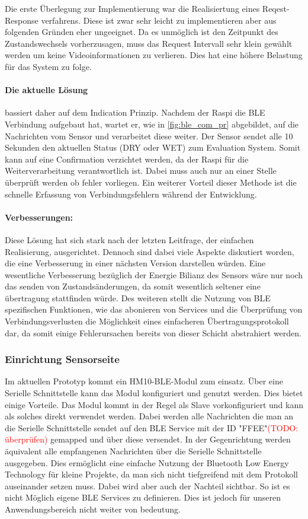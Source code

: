 Die erste Überlegung zur Implementierung war die Realisiertung eines Reqest-Response verfahrens. Diese ist zwar sehr leicht zu implementieren aber aus folgenden Gründen eher ungeeignet. 
Da es unmöglich ist den Zeitpunkt des Zustandswechsels vorherzusagen, muss das Request Intervall sehr klein gewählt werden um keine Videoinformationen zu verlieren. Dies hat eine höhere Belastung für das System zu folge. 

\paragraph{Die aktuelle Lösung} bassiert daher auf dem Indication Prinzip. Nachdem der Raspi die BLE Verbindung aufgebaut hat, wartet er, wie in \ref{fig:ble_com_pr} abgebildet, auf die Nachrichten vom Sensor und verarbeitet diese weiter. Der Sensor sendet alle 10 Sekunden den aktuellen Status (DRY oder WET) zum Evaluation System. Somit kann auf eine Confirmation verzichtet werden, da der Raspi für die Weiterverarbeitung verantwortlich ist. Dabei muss auch nur an einer Stelle überprüft werden ob fehler vorliegen. Ein weiterer Vorteil dieser Methode ist die schnelle Erfassung von Verbindungsfehlern während der Entwicklung.

\paragraph{Verbesserungen:} Diese Lösung hat sich stark nach der letzten Leitfrage, der einfachen Realisierung, ausgerichtet. Dennoch sind dabei viele Aspekte diskutiert worden, die eine Verbesserung in einer nächsten Version darstellen würden. Eine wesentliche Verbesserung bezüglich der Energie Bilianz des Sensors wäre nur noch das senden von Zustandsänderungen, da somit wesentlich seltener eine übertragung stattfinden würde. Des weiteren stellt die Nutzung von BLE spezifischen Funktionen, wie das abonieren von Services und die Überprüfung von Verbindungsverlusten die Möglichkeit eines einfacheren Übertragungsprotokoll dar, da somit einige Fehlerursachen bereits von dieser Schicht abstrahiert werden.

\subsubsection{Einrichtung Sensorseite}
Im aktuellen Prototyp kommt ein HM10-BLE-Modul zum einsatz. Über eine Serielle Schnittstelle kann das Modul konfiguriert und genutzt werden. Dies bietet einige Vorteile. Das Modul kommt in der Regel als Slave vorkonfiguriert und kann als solches direkt verwendet werden. Dabei werden alle Nachrichten die man an die Serielle Schnittstelle sendet auf den BLE Service mit der ID "FFEE"\textcolor{red}{(TODO: überprüfen)} gemapped und über diese versendet. In der Gegenrichtung werden äquivalent alle empfangenen Nachrichten über die Serielle Schnittstelle ausgegeben. Dies ermöglicht eine einfache Nutzung der Bluetooth Low Energy Technology für kleine Projekte, da man sich nicht tiefgreifend mit dem Protokoll auseinander setzen muss. Dabei wird aber auch der Nachteil sichtbar. So ist es nicht Möglich eigene BLE Services zu definieren. Dies ist jedoch für unseren Anwendungsbereich nicht weiter von bedeutung. 

